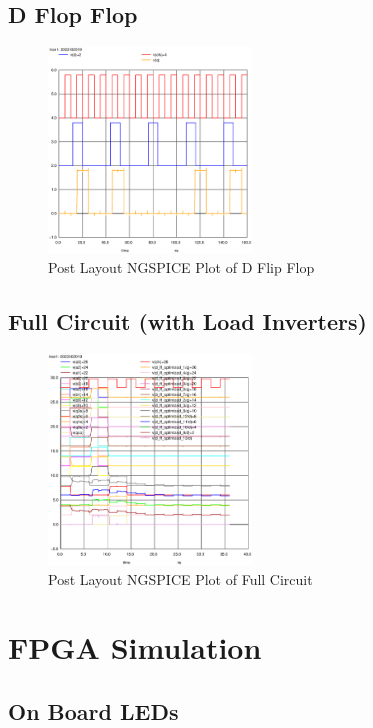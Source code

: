 \documentclass[conference]{IEEEtran}
\begin{document}
\subsection{D Flop Flop}

\begin{figure}[H]
    \centering
    \includegraphics[width=0.48\textwidth]{images/d_ff_optimized_post_tran.eps}
    \caption{Post Layout NGSPICE Plot of D Flip Flop}
\end{figure}

\subsection{Full Circuit (with Load Inverters)}

\begin{figure}[H]
    \centering
    \includegraphics[width=0.48\textwidth]{images/full_optimized_load_post_tran.eps}
    \caption{Post Layout NGSPICE Plot of Full Circuit}
\end{figure}

\section{FPGA Simulation}

\subsection{On Board LEDs}
\end{document}
